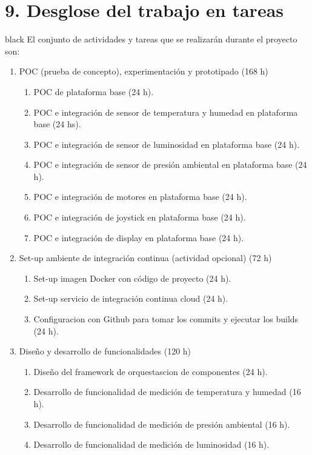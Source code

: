\documentclass[
11pt, %
]{charter}
\begin{document}
\section{9. Desglose del trabajo en tareas}
\label{sec:wbs}

\begin{consigna}{black}
El conjunto de actividades y tareas que se realizarán durante el proyecto son:

\begin{enumerate}
\item POC (prueba de concepto), experimentación y prototipado (168 h)
	\begin{enumerate}
	\item POC de plataforma base (24 h).
	\item POC e integración de sensor de temperatura y humedad en plataforma base (24 hs).
	\item POC e integración de sensor de luminosidad en plataforma base (24 h).
	\item POC e integración de sensor de presión ambiental en plataforma base (24 h).
	\item POC e integración de motores en plataforma base (24 h).
	\item POC e integración de joystick en plataforma base (24 h).
	\item POC e integración de display en plataforma base (24 h).
	\end{enumerate}
\item Set-up ambiente de integración continua (actividad opcional) (72 h)
	\begin{enumerate}
	\item Set-up imagen Docker con código de proyecto (24 h).
	\item Set-up servicio de integración continua cloud (24 h).
	\item Configuracion con Github para tomar los commits y ejecutar los builds (24 h).
	\end{enumerate}
\item Diseño y desarrollo de funcionalidades (120 h)
	\begin{enumerate}
	\item Diseño del framework de orquestascion de componentes (24 h).
	\item Desarrollo de funcionalidad de medición de temperatura y humedad (16 h).
	\item Desarrollo de funcionalidad de medición de presión ambiental (16 h).
	\item Desarrollo de funcionalidad de medición de luminosidad (16 h).

\end{enumerate}
\end{enumerate}
\end{consigna}
\end{document}
